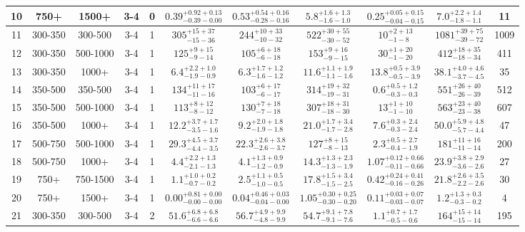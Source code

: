 \documentclass[11pt, oneside]{article}
\begin{document}
\begin{table}
{\begin{tabular}{ |c|c|c|c|c||c|c|c|c||c|c| }
10 & 750+ & 1500+ & 3-4 & 0 & $0.39^{+0.92+0.13}_{-0.39-0.00}$ & $0.53^{+0.54+0.16}_{-0.28-0.16}$ & $5.8^{+1.6+1.3}_{-1.6-1.0}$ & $0.25^{+0.05+0.15}_{-0.04-0.15}$ & $7.0^{+2.2+1.4}_{-1.8-1.1}$ & 11 \\ \hline
11 & 300-350 & 300-500 & 3-4 & 1 & $305^{+15+37}_{-15-36}$ & $244^{+10+33}_{-10-32}$ & $522^{+30+55}_{-30-52}$ & $10^{+ 2+13}_{- 1- 8}$ & $1081^{+39+75}_{-39-72}$ & 1009 \\ \hline
12 & 300-350 & 500-1000 & 3-4 & 1 & $125^{+ 9+15}_{- 9-14}$ & $105^{+ 6+18}_{- 6-18}$ & $153^{+ 9+16}_{- 9-15}$ & $30^{+ 1+20}_{- 1-20}$ & $412^{+18+35}_{-18-34}$ & 411 \\ \hline
13 & 300-350 & 1000+ & 3-4 & 1 & $6.4^{+2.2+1.0}_{-1.9-0.9}$ & $6.3^{+1.7+1.2}_{-1.6-1.2}$ & $11.6^{+1.1+1.9}_{-1.1-1.6}$ & $13.8^{+0.5+3.9}_{-0.5-3.9}$ & $38.1^{+4.0+4.6}_{-3.7-4.5}$ & 35 \\ \hline
14 & 350-500 & 350-500 & 3-4 & 1 & $134^{+11+17}_{-11-16}$ & $103^{+ 6+17}_{- 6-17}$ & $314^{+19+32}_{-19-31}$ & $0.6^{+0.5+1.2}_{-0.3-0.3}$ & $551^{+26+40}_{-26-39}$ & 512 \\ \hline
15 & 350-500 & 500-1000 & 3-4 & 1 & $113^{+ 8+12}_{- 8-12}$ & $130^{+ 7+18}_{- 7-18}$ & $307^{+18+31}_{-18-30}$ & $13^{+ 1+10}_{- 1-10}$ & $563^{+23+40}_{-23-38}$ & 607 \\ \hline
16 & 350-500 & 1000+ & 3-4 & 1 & $12.2^{+3.7+1.7}_{-3.5-1.6}$ & $9.2^{+2.0+1.8}_{-1.9-1.8}$ & $21.0^{+1.7+3.4}_{-1.7-2.8}$ & $7.6^{+0.3+2.4}_{-0.3-2.4}$ & $50.0^{+5.9+4.8}_{-5.7-4.4}$ & 47 \\ \hline
17 & 500-750 & 500-1000 & 3-4 & 1 & $29.3^{+4.5+3.7}_{-4.4-3.5}$ & $22.3^{+2.6+3.8}_{-2.6-3.7}$ & $127^{+ 8+15}_{- 8-13}$ & $2.3^{+0.5+2.7}_{-0.4-1.9}$ & $181^{+11+16}_{-11-14}$ & 200 \\ \hline
18 & 500-750 & 1000+ & 3-4 & 1 & $4.4^{+2.2+1.3}_{-2.1-1.3}$ & $4.1^{+1.3+0.9}_{-1.2-0.9}$ & $14.3^{+1.3+2.3}_{-1.3-1.9}$ & $1.07^{+0.12+0.66}_{-0.11-0.66}$ & $23.9^{+3.8+2.9}_{-3.6-2.6}$ & 27 \\ \hline
19 & 750+ & 750-1500 & 3-4 & 1 & $1.1^{+1.0+0.2}_{-0.7-0.2}$ & $2.5^{+1.1+0.5}_{-1.0-0.5}$ & $17.8^{+1.5+3.4}_{-1.5-2.5}$ & $0.42^{+0.24+0.41}_{-0.16-0.26}$ & $21.8^{+2.6+3.5}_{-2.2-2.6}$ & 30 \\ \hline
20 & 750+ & 1500+ & 3-4 & 1 & $0.00^{+0.81+0.00}_{-0.00-0.00}$ & $0.04^{+0.46+0.03}_{-0.04-0.00}$ & $1.05^{+0.30+0.25}_{-0.30-0.20}$ & $0.11^{+0.03+0.07}_{-0.03-0.07}$ & $1.2^{+1.3+0.3}_{-0.3-0.2}$ & 4 \\ \hline
21 & 300-350 & 300-500 & 3-4 & 2 & $51.6^{+6.8+6.8}_{-6.6-6.6}$ & $56.7^{+4.9+9.9}_{-4.8-9.9}$ & $54.7^{+9.1+7.8}_{-9.1-7.6}$ & $1.1^{+0.7+1.7}_{-0.5-0.6}$ & $164^{+15+14}_{-15-14}$ & 195 \\ \hline

\end{tabular}}
\end{table}
\end{document}
